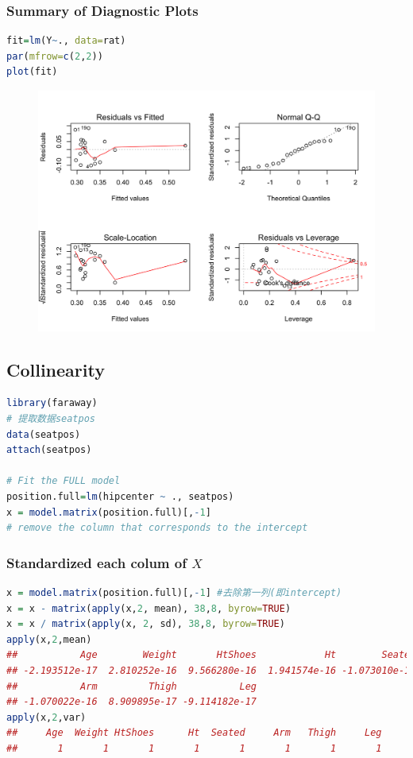\documentclass[11pt,a4paper]{article}
\begin{document}
\subsubsection{Summary of Diagnostic Plots}
\begin{lstlisting}[language=R]
fit=lm(Y~., data=rat)
par(mfrow=c(2,2))
plot(fit)
\end{lstlisting}
\begin{center}\begin{figure}[htbp]
  \centering
  \includegraphics[scale=0.3]{rat2.png}
  \caption{}
  \label{}
\end{figure}\end{center}


\subsection{Collinearity}
\begin{lstlisting}[language=R]
library(faraway)
# 提取数据seatpos
data(seatpos)
attach(seatpos)

# Fit the FULL model
position.full=lm(hipcenter ~ ., seatpos)
x = model.matrix(position.full)[,-1]
# remove the column that corresponds to the intercept
\end{lstlisting}

\subsubsection{Standardized each colum of $X$}
\begin{lstlisting}[language=R]
x = model.matrix(position.full)[,-1] #去除第一列(即intercept)
x = x - matrix(apply(x,2, mean), 38,8, byrow=TRUE)
x = x / matrix(apply(x, 2, sd), 38,8, byrow=TRUE)
apply(x,2,mean)
##           Age        Weight       HtShoes            Ht        Seated 
## -2.193512e-17  2.810252e-16  9.566280e-16  1.941574e-16 -1.073010e-15 
##           Arm         Thigh           Leg 
## -1.070022e-16  8.909895e-17 -9.114182e-17
apply(x,2,var)
##     Age  Weight HtShoes      Ht  Seated     Arm   Thigh     Leg 
##       1       1       1       1       1       1       1       1
\end{lstlisting}
\end{document}
